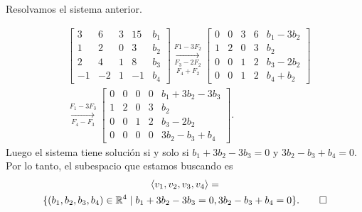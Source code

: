 \documentclass[handout]{beamer} %
\begin{document}
    \begin{frame}
    
    Resolvamos  el sistema anterior.  \pause

    \begin{align*}
        &\left[\begin{array}{cccc|c}
        3&6&3&15&b_1\\
        1&2&0&3&b_2\\
        2&4&1&8&b_3\\
        -1&-2&1&-1&b_4
        \end{array}\right] 
        \underset{F_4+F_2}{\underset{F_3-2F_2}{\stackrel{F1-3F_2}{\longrightarrow}}} 
        \left[\begin{array}{cccc|c}
        0&0&3&6&b_1-3b_2\\
        1&2&0&3&b_2\\
        0&0&1&2&b_3-2b_2\\
        0&0&1&2&b_4+b_2
        \end{array}\right] \\
        &\underset{F_4-F_3}{\stackrel{F_1-3F_3}{\longrightarrow}}
        \left[\begin{array}{cccc|c}
        0&0&0&0&b_1+3b_2-3b_3\\
        1&2&0&3&b_2\\
        0&0&1&2&b_3-2b_2\\
        0&0&0&0&3b_2-b_3+b_4
        \end{array}\right].
    \end{align*}
    \pause Luego el sistema tiene solución si y solo si $b_1+3b_2-3b_3=0$ y $3b_2-b_3+b_4=0$. Por lo tanto, el subespacio que estamos buscando es
    \begin{multline*}
        \langle v_1, v_2, v_3, v_4\rangle=\\\{(b_1,b_2,b_3,b_4)\in\mathbb{R}^4\mid b_1+3b_2-3b_3=0,3b_2-b_3+b_4=0\}.\qed
    \end{multline*}
    
    \end{frame}
    
    
    
\end{document}
